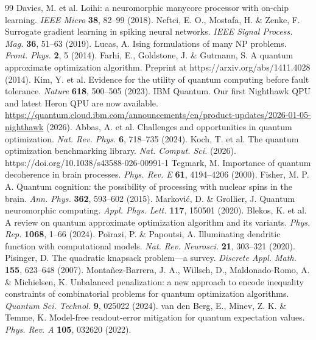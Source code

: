 \documentclass[12pt,a4paper]{article}
\begin{document}
\begin{thebibliography}{99}
 Davies, M. et al. Loihi: a neuromorphic manycore processor with on-chip learning. \textit{IEEE Micro} \textbf{38}, 82--99 (2018).
 Neftci, E. O., Mostafa, H. \& Zenke, F. Surrogate gradient learning in spiking neural networks. \textit{IEEE Signal Process. Mag.} \textbf{36}, 51--63 (2019).
 Lucas, A. Ising formulations of many NP problems. \textit{Front. Phys.} \textbf{2}, 5 (2014).
 Farhi, E., Goldstone, J. \& Gutmann, S. A quantum approximate optimization algorithm. Preprint at https://arxiv.org/abs/1411.4028 (2014).
 Kim, Y. et al. Evidence for the utility of quantum computing before fault tolerance. \textit{Nature} \textbf{618}, 500--505 (2023).
 IBM Quantum. Our first Nighthawk QPU and latest Heron QPU are now available. \url{https://quantum.cloud.ibm.com/announcements/en/product-updates/2026-01-05-nighthawk} (2026).
 Abbas, A. et al. Challenges and opportunities in quantum optimization. \textit{Nat. Rev. Phys.} \textbf{6}, 718--735 (2024).
 Koch, T. et al. The quantum optimization benchmarking library. \textit{Nat. Comput. Sci.} (2026). https://doi.org/10.1038/s43588-026-00991-1
 Tegmark, M. Importance of quantum decoherence in brain processes. \textit{Phys. Rev. E} \textbf{61}, 4194--4206 (2000).
 Fisher, M. P. A. Quantum cognition: the possibility of processing with nuclear spins in the brain. \textit{Ann. Phys.} \textbf{362}, 593--602 (2015).
 Markovi\'c, D. \& Grollier, J. Quantum neuromorphic computing. \textit{Appl. Phys. Lett.} \textbf{117}, 150501 (2020).
 Blekos, K. et al. A review on quantum approximate optimization algorithm and its variants. \textit{Phys. Rep.} \textbf{1068}, 1--66 (2024).
 Poirazi, P. \& Papoutsi, A. Illuminating dendritic function with computational models. \textit{Nat. Rev. Neurosci.} \textbf{21}, 303--321 (2020).
 Pisinger, D. The quadratic knapsack problem---a survey. \textit{Discrete Appl. Math.} \textbf{155}, 623--648 (2007).
 Monta\~nez-Barrera, J. A., Willsch, D., Maldonado-Romo, A. \& Michielsen, K. Unbalanced penalization: a new approach to encode inequality constraints of combinatorial problems for quantum optimization algorithms. \textit{Quantum Sci. Technol.} \textbf{9}, 025022 (2024).
 van den Berg, E., Minev, Z. K. \& Temme, K. Model-free readout-error mitigation for quantum expectation values. \textit{Phys. Rev. A} \textbf{105}, 032620 (2022).

\end{thebibliography}
\end{document}
